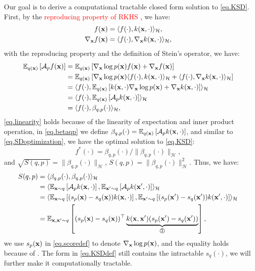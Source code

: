 \documentclass{article}
\begin{document}
Our goal is to derive a computational tractable closed form solution to \eqref{eq.KSD}. First, by the \textcolor{red}{reproducing property of RKHS} \citep{sejdinovic2012rkhs}, we have:
\begin{align}
    f({\mathbf{x}}) &= \langle f(\cdot), k({\mathbf{x}}, \cdot) \rangle_{\mathcal{H}}, \\
    \nabla_{\mathbf{x}} f({\mathbf{x}}) &= \langle f(\cdot), \nabla_{\mathbf{x}} k({\mathbf{x}}, \cdot) \rangle_{\mathcal{H}},
\end{align}
with the reproducing property and the definition of Stein's operator, we have:
\begin{align}
    \mathbb{E}_{q({\mathbf{x}})}\left[ \mathcal{A}_p f({\mathbf{x}}) \right] &= \mathbb{E}_{q({\mathbf{x}})}\left[ \nabla_{\mathbf{x}} \log p({\mathbf{x}}) f({\mathbf{x}}) + \nabla_{\mathbf{x}} f({\mathbf{x}}) \right] \\
    &= \mathbb{E}_{q({\mathbf{x}})}\left[ \nabla_{\mathbf{x}} \log p({\mathbf{x}}) \langle f(\cdot), k({\mathbf{x}}, \cdot) \rangle_\mathcal{H} + \langle f(\cdot), \nabla_{\mathbf{x}} k({\mathbf{x}}, \cdot) \rangle_\mathcal{H}\right] \\
    &= \langle f(\cdot), \mathbb{E}_{q({\mathbf{x}})}\left[ k({\mathbf{x}}, \cdot)\nabla_{\mathbf{x}} \log p({\mathbf{x}}) + \nabla_{\mathbf{x}} k({\mathbf{x}}, \cdot)\right] \rangle_\mathcal{H} \label{eq.linearity}\\
    &= \langle f(\cdot), \mathbb{E}_{q({\mathbf{x}})}\left[ \mathcal{A}_{p}k({\mathbf{x}}, \cdot)\right] \rangle_\mathcal{H} \\
    &= \langle f(\cdot), \beta_{q, p}(\cdot) \rangle_\mathcal{H}, \label{eq.betaqp}
\end{align}
\eqref{eq.linearity} holds because of the linearity of expectation and inner product operation, in \eqref{eq.betaqp} we define $\beta_{q, p}(\cdot) = \mathbb{E}_{q({\mathbf{x}})}\left[ \mathcal{A}_{p}k({\mathbf{x}}, \cdot)\right]$, and similar to \eqref{eq.SDoptimization}, we have the optimal solution to \eqref{eq.KSD}:
\begin{equation}
    f^*(\cdot) = \beta_{q, p}(\cdot) / \| \beta_{q, p}(\cdot) \|_{\mathcal{H}},
\end{equation}
and $\sqrt{S(q, p)} = \| \beta_{q, p}(\cdot) \|_{\mathcal{H}}$, $S(q, p) = \| \beta_{q, p}(\cdot) \|_{\mathcal{H}}^2$. Thus, we have:
\begin{align}
    S(q, p) &= \langle \beta_{q, p}(\cdot), \beta_{q, p}(\cdot) \rangle_{\mathcal{H}} \\
    &= \langle \mathbb{E}_{{\mathbf{x}} \sim q}\left[ \mathcal{A}_p k({\mathbf{x}}, \cdot) \right], \mathbb{E}_{{\mathbf{x}}' \sim q}\left[ \mathcal{A}_p k({\mathbf{x}}', \cdot) \right] \rangle_\mathcal{H} \\
    &= \langle \mathbb{E}_{{\mathbf{x}} \sim q}\left[ (s_p({\mathbf{x}}) - s_q({\mathbf{x}})) k({\mathbf{x}}, \cdot) \right], \mathbb{E}_{{\mathbf{x}}' \sim q}\left[ (s_p({\mathbf{x}}') - s_q({\mathbf{x}}')) k({\mathbf{x}}', \cdot) \right] \rangle_\mathcal{H} \label{eq.scoredef}\\
    &= \mathbb{E}_{{\mathbf{x}}, {\mathbf{x}}' \sim q}\left[ (s_p({\mathbf{x}}) - s_q({\mathbf{x}}))^\top \underbrace{k({\mathbf{x}}, {\mathbf{x}}') (s_p({\mathbf{x}}') - s_q({\mathbf{x}}'))}_{\text{\textcircled{1}}} \right], \label{eq.KSDdef}
\end{align}
we use $s_p({\mathbf{x}})$ in \eqref{eq.scoredef} to denote $\nabla_{\mathbf{x}} \log p({\mathbf{x}})$, and the equality holds because of . The form in \eqref{eq.KSDdef} still contains the intractable $s_q(\cdot)$, we will further make it computationally tractable.
\end{document}
